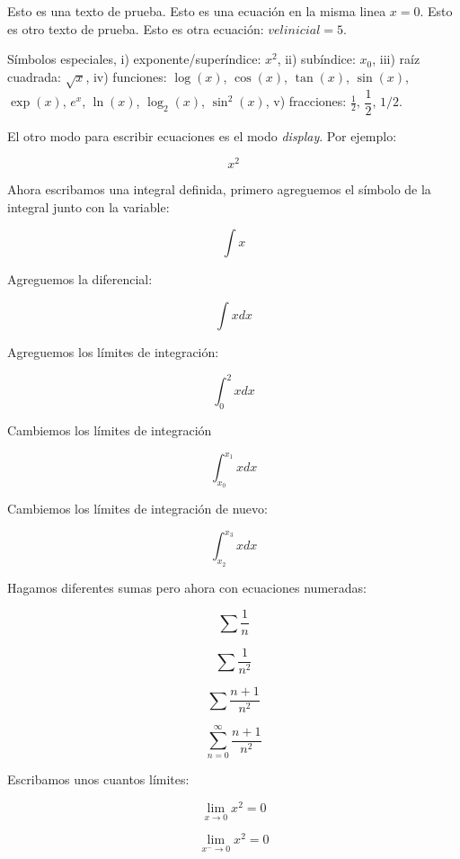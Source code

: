 \documentclass{article}
\begin{document}
Esto es una texto de prueba. Esto es una ecuación en la misma linea $x=0$. Esto es otro texto de prueba. Esto es otra ecuación: $vel inicial = 5$.

Símbolos especiales, i) exponente/superíndice: $x^{2}$, ii) subíndice: $x_{0}$, iii) raíz cuadrada: $\sqrt{x}$, iv) funciones: $\log(x)$, $\cos(x)$, $\tan(x)$, $\sin(x)$, $\exp(x)$, $e^{x}$, $\ln(x)$, $\log_{2}(x)$, $\sin^{2}(x)$,
v) fracciones: $\frac{1}{2}$, $\dfrac{1}{2}$, $1/2$.

El otro modo para escribir ecuaciones es el modo \emph{display}. Por ejemplo:

\[x^2\]

Ahora escribamos una integral definida, primero agreguemos el símbolo de la integral junto con la variable:

\[\int x\]

Agreguemos la diferencial:

\[\int x dx\]

Agreguemos los límites de integración:

\[\int_{0}^{2} x dx\]

Cambiemos los límites de integración

\[\int_{x_{0}}^{x_{1}} x dx\]

Cambiemos los límites de integración de nuevo:

\[\int_{x_{2}}^{x_{3}} x dx\]

Hagamos diferentes sumas pero ahora con ecuaciones numeradas:

\begin{equation}
    \sum \frac{1}{n}
\end{equation}

\begin{equation}
    \sum \frac{1}{n^2}
\end{equation}

\begin{equation}
    \sum \frac{n+1}{n^2}
\end{equation}

\begin{equation*}
    \sum_{n=0}^{\infty} \frac{n+1}{n^2}
\end{equation*}

Escribamos unos cuantos límites:

\begin{equation}
\lim_{x \to 0} x^{2} = 0
\end{equation}

\begin{equation}
\lim_{x^{-} \to 0} x^{2} = 0
\end{equation}
\end{document}
